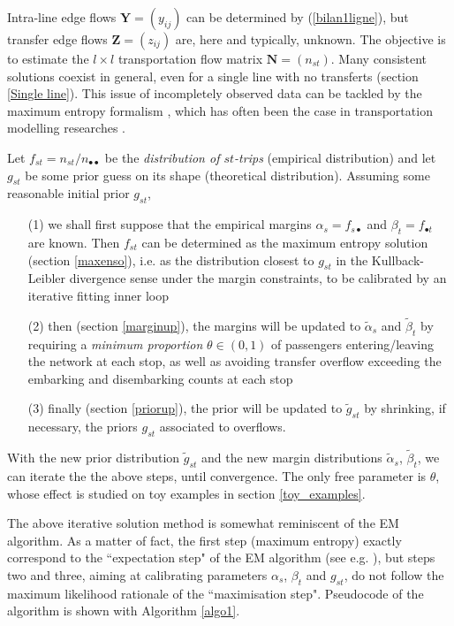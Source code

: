\documentclass{bmcart}
\begin{document}
Intra-line edge flows $\mathbf{Y}=(y_{ij})$ can be determined by (\ref{bilan1ligne}), but transfer edge flows $\mathbf{Z}=(z_{ij})$ are, here and typically, unknown. The objective is to estimate the $l\times l$ transportation flow matrix $\mathbf{N}=(n_{st})$. Many consistent solutions coexist in general, even for a single line with no transferts (section \ref{Single line}). This issue of incompletely observed data can be tackled by the maximum entropy formalism \cite{jaynes1957information}, which has often been the case in transportation modelling researches \cite{wilson1967statistical}  \cite{erlander1990gravity}. 



Let $f_{st}=n_{st}/n_{\bullet\bullet}$ be the \emph{distribution of $st$-trips} (empirical distribution) and let $g_{st}$ be some prior guess on its shape (theoretical distribution). 
Assuming some reasonable initial prior $g_{st}$, 
\begin{itemize}
\item[(1)] we shall first suppose that the empirical margins $\alpha_s=f_{s\bullet}$ and $\beta_t=f_{\bullet t}$ are known.  
Then $f_{st}$ can be determined as the maximum entropy solution (section \ref{maxenso}), i.e. as the distribution closest to $g_{st}$ in the Kullback-Leibler divergence sense under the margin constraints, to be calibrated by an iterative fitting inner loop
\item[(2)] then (section \ref{marginup}), the margins will be updated to $\tilde{\alpha}_s$ and $\tilde{\beta}_t$   by requiring a \emph{minimum proportion} $\theta\in (0,1)$ of passengers entering/leaving the network at each stop, as well as avoiding transfer overflow exceeding the embarking and disembarking counts at each stop
 \item[(3)] finally (section \ref{priorup}), the prior will be updated to $\tilde{g}_{st}$ by shrinking, if necessary, the priors $g_{st}$ associated to overflows. 
\end{itemize}
With the new prior distribution $\widetilde{g}_{st}$ and the new margin distributions $\widetilde{\alpha}_s$, $\widetilde{\beta}_t$, we can iterate the 
 the above steps, until convergence. The only free parameter is $\theta$, whose effect is studied on toy examples in section \ref{toy_examples}.
 
The above iterative solution method is somewhat reminiscent of the EM algorithm. As a matter of fact, the first  step  (maximum entropy) exactly correspond to the ``expectation step" of the EM algorithm (see e.g. \cite{dempster1977maximum}  \cite{bavaud2009information}), but steps two and three, aiming at calibrating parameters $\alpha_s$, $\beta_t$ and $g_{st}$, do not follow the maximum likelihood rationale of the ``maximisation step". Pseudocode of the algorithm is shown with Algorithm \ref{algo1}.
\end{document}
